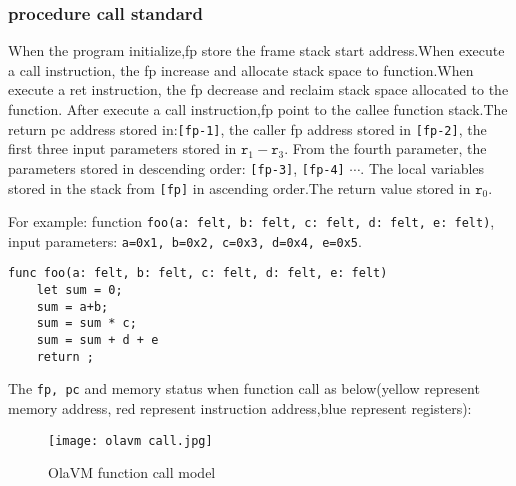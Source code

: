 \subsubsection{procedure call standard}\label{subsec: processor-instructions-executor-abi}

When the program initialize,fp store the frame stack start address.When execute a call instruction, the fp increase and allocate stack space to function.When execute a ret instruction, the fp decrease and reclaim stack space allocated to the function.
After execute a call instruction,fp point to the callee function stack.The return pc address stored in:\texttt{[fp-1]}, the caller fp address stored in \texttt{[fp-2]}, the first three input parameters stored in $\texttt{r}_1 - \texttt{r}_{3}$.
From the fourth parameter, the parameters stored in descending order: \texttt{[fp-3]}, \texttt{[fp-4]} $\cdots$.
The local variables stored in the stack from \texttt{[fp]} in ascending order.The return value stored in $\texttt{r}_0$.

For example: function \texttt{foo(a: felt, b: felt, c: felt, d: felt, e: felt)}, input parameters: \texttt{a=0x1, b=0x2, c=0x3, d=0x4, e=0x5}.
\begin{lstlisting}[label={lst:function_call}]
func foo(a: felt, b: felt, c: felt, d: felt, e: felt)
    let sum = 0;
    sum = a+b;
    sum = sum * c;
    sum = sum + d + e
    return ;
\end{lstlisting}

The \texttt{fp, pc} and memory status when function call as below(yellow represent memory address, red represent instruction address,blue represent registers):
\begin{figure}[!htp]
    \centering
    \texttt{[image: olavm call.jpg]}
    \caption{OlaVM function call model}
    \label{fig:processor call}
\end{figure}
